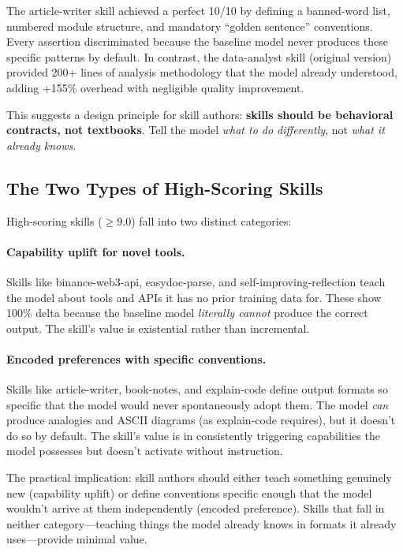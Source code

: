 \documentclass[11pt,a4paper]{article}
\begin{document}
The article-writer skill achieved a perfect 10/10 by defining a banned-word list, numbered module structure, and mandatory ``golden sentence'' conventions. Every assertion discriminated because the baseline model never produces these specific patterns by default. In contrast, the data-analyst skill (original version) provided 200+ lines of analysis methodology that the model already understood, adding +155\% overhead with negligible quality improvement.

This suggests a design principle for skill authors: \textbf{skills should be behavioral contracts, not textbooks}. Tell the model \emph{what to do differently}, not \emph{what it already knows}.

\subsection{The Two Types of High-Scoring Skills}

High-scoring skills ($\geq 9.0$) fall into two distinct categories:

\paragraph{Capability uplift for novel tools.}
Skills like binance-web3-api, easydoc-parse, and self-improving-reflection teach the model about tools and APIs it has no prior training data for. These show 100\% delta because the baseline model \emph{literally cannot} produce the correct output. The skill's value is existential rather than incremental.

\paragraph{Encoded preferences with specific conventions.}
Skills like article-writer, book-notes, and explain-code define output formats so specific that the model would never spontaneously adopt them. The model \emph{can} produce analogies and ASCII diagrams (as explain-code requires), but it doesn't do so by default. The skill's value is in consistently triggering capabilities the model possesses but doesn't activate without instruction.

The practical implication: skill authors should either teach something genuinely new (capability uplift) or define conventions specific enough that the model wouldn't arrive at them independently (encoded preference). Skills that fall in neither category---teaching things the model already knows in formats it already uses---provide minimal value.
\end{document}
